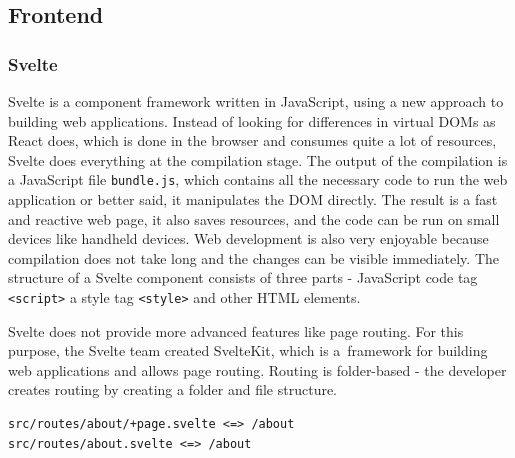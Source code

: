 







\subsection{Frontend}




\subsubsection{Svelte}

Svelte is a component framework written in JavaScript, using a new approach to building web applications. Instead of looking for differences in virtual DOMs as React does, which is done in the browser and consumes quite a lot of resources, Svelte does everything at the compilation stage. The output of the compilation is a JavaScript file \verb|bundle.js|, which contains all the necessary code to run the web application or better said, it manipulates the DOM directly. The result is a fast and reactive web page, it also saves resources, and the code can be run on small devices like handheld devices. Web development is also very enjoyable because compilation does not take long and the changes can be visible immediately. The structure of a Svelte component consists of three parts - JavaScript code tag \verb|<script>| a style tag \verb|<style>| and other HTML elements. 

Svelte does not provide more advanced features like page routing. For this purpose, the Svelte team created SvelteKit, which is a~framework for building web applications and allows page routing. Routing is folder-based - the developer creates routing by creating a folder and file structure.

\begin{verbatim}
src/routes/about/+page.svelte <=> /about
src/routes/about.svelte <=> /about
\end{verbatim}


